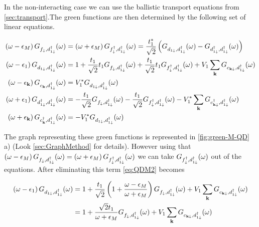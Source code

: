 In the non-interacting case we can use the ballistic transport equations from \ref{sec:transport}.The green functions are then determined by the following set of linear equations. 




\begin{align}
    \left(\omega-\epsilon_{M}\right)G_{f_{\downarrow},d_{1\downarrow}^{\dagger}}(\omega)&=\left(\omega+\epsilon_{M}\right)G_{f_{\downarrow}^{\dagger},d_{1\downarrow}^{\dagger}}(\omega)=\frac{t^*_1}{\sqrt{2}}\left(G_{d_{1\downarrow},d_{1\downarrow}^{\dagger}}(\omega)-G_{d_{1\downarrow}^{\dagger},d_{1\downarrow}^{\dagger}}(\omega)\right) \label{eq:QDM1} \\ 
    \left(\omega-\epsilon_{1}\right)G_{d_{1\downarrow},d_{1\downarrow}^{\dagger}}(\omega)&=1+\frac{t_1}{\sqrt{2}}t_{1}G_{f_{\downarrow},d_{1\downarrow}^{\dagger}}(\omega)+\frac{t_1}{\sqrt{2}}t_{1}G_{f_{\downarrow}^{\dagger},d_{1\downarrow}^{\dagger}}(\omega)+V_{1}\sum_{\mathbf{k}}G_{c_{\mathbf{k\downarrow}},d_{1\downarrow}^{\dagger}}(\omega) \label{eq:QDM2} \\ 
    \left(\omega-\epsilon_{\mathbf{k}}\right)G_{c_{\mathbf{k}},d_{1\downarrow}^{\dagger}}(\omega)&=V_{1}^{*}G_{d_{1\downarrow},d_{1\downarrow}^{\dagger}}(\omega)\label{eq:QDM3} \\
    \left(\omega+\epsilon_{1}\right)G_{d_{1\downarrow}^{\dagger},d_{1\downarrow}^{\dagger}}(\omega)&=-\frac{t_1}{\sqrt{2}}G_{f_{\downarrow},d_{1\downarrow}^{\dagger}}(\omega)-\frac{t_1}{\sqrt{2}}G_{f_{\downarrow}^{\dagger},d_{1\downarrow}^{\dagger}}(\omega)-V_{1}^{*}\sum_{\mathbf{k}}G_{c_{\mathbf{k\downarrow}}^{\dagger},d_{1\downarrow}^{\dagger}}(\omega) \label{eq:QDM4} \\
    \left(\omega+\epsilon_{\mathbf{k}}\right)G_{c^\dagger_{\mathbf{k}},d_{1\downarrow}^{\dagger}}(\omega)&=-V_{1}^{*}G_{d_{1\downarrow},d_{1\downarrow}^{\dagger}}(\omega) \label{eq:QDM5}
\end{align}

The graph representing these green functions is represented in \ref{fig:green-M-QD} a)  (Look \ref{sec:GraphMethod} for details). However using that $\left(\omega-\epsilon_{M}\right)G_{f_{\downarrow},d_{1\downarrow}^{\dagger}}(\omega)=\left(\omega+\epsilon_{M}\right)G_{f_{\downarrow}^{\dagger},d_{1\downarrow}^{\dagger}}(\omega)$ we can take
 $G_{f_{\downarrow}^{\dagger},d_{1\downarrow}^{\dagger}}(\omega)$ out of the equations. After eliminating this term \ref{eq:QDM2} becomes
 
 \begin{align}
\left(\omega-\epsilon_{1}\right)G_{d_{1\downarrow},d_{1\downarrow}^{\dagger}}(\omega)&=1+\frac{t_{1}}{\sqrt{2}}\left(1+\frac{\omega-\epsilon_{M}}{\omega+\epsilon_{M}}\right)G_{f_{\downarrow},d_{1\downarrow}^{\dagger}}(\omega)+V_{1}\sum_{\mathbf{k}}G_{c_{\mathbf{k\downarrow}},d_{1\downarrow}^{\dagger}}(\omega) \\
&=1+\frac{\sqrt{2}t_{1}}{\omega+\epsilon_{M}}G_{f_{\downarrow},d_{1\downarrow}^{\dagger}}(\omega)+V_{1}\sum_{\mathbf{k}}G_{c_{\mathbf{k\downarrow}},d_{1\downarrow}^{\dagger}}(\omega)
\end{align}


